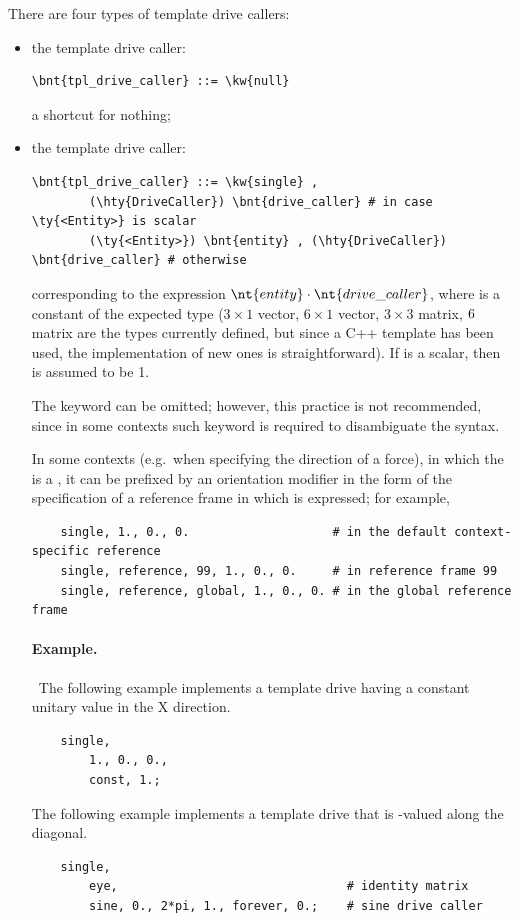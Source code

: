 There are four types of template drive callers:
\begin{itemize}
\item the  template drive caller:
\begin{Verbatim}[commandchars=\\\{\}]
    \bnt{tpl_drive_caller} ::= \kw{null}
\end{Verbatim}
a shortcut for nothing;
\item the  template drive caller:
\begin{Verbatim}[commandchars=\\\{\}]
    \bnt{tpl_drive_caller} ::= \kw{single} ,
        (\hty{DriveCaller}) \bnt{drive_caller} # in case \ty{<Entity>} is scalar
        (\ty{<Entity>}) \bnt{entity} , (\hty{DriveCaller}) \bnt{drive_caller} # otherwise
\end{Verbatim}
corresponding to the expression $\nt{entity} \cdot \nt{drive\_caller}$,
where  is a constant of the expected type ($3 \times 1$ 
vector, $6 \times 1$ vector, $3 \times 3$ matrix, $6 \time 6$ matrix
are the types currently defined, but since 
a C++ template has been used, the implementation of new ones 
is straightforward).
If  is a scalar, then  is assumed to be 1.

\begin{framed}
The keyword  can be omitted; however, this practice is not recommended,
since in some contexts such keyword is required to disambiguate the syntax.
\end{framed}

In some contexts (e.g.\ when specifying the direction of a force),
in which the  is a , it can be prefixed
by an orientation modifier in the form of the specification
of a reference frame in which  is expressed; for example,
\begin{verbatim}
    single, 1., 0., 0.                    # in the default context-specific reference 
    single, reference, 99, 1., 0., 0.     # in reference frame 99
    single, reference, global, 1., 0., 0. # in the global reference frame
\end{verbatim}

\paragraph{Example.} \
The following example implements a  template drive having a constant unitary value in the X direction.
\begin{verbatim}
    single,
        1., 0., 0.,
        const, 1.;
\end{verbatim}
The following example implements a  template drive that is -valued along the diagonal.
\begin{verbatim}
    single,
        eye,                                # identity matrix
        sine, 0., 2*pi, 1., forever, 0.;    # sine drive caller
\end{verbatim}


\end{itemize}
